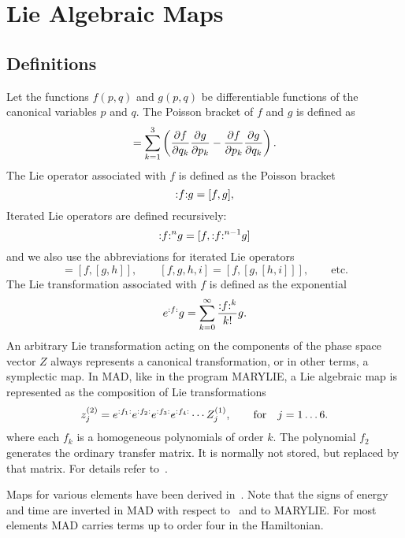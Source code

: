  
 
\chapter{Lie Algebraic Maps}
\label{LIE}
 
\section{Definitions}
Let the functions $f(p,q)$ and $g(p,q)$ be differentiable functions of
the canonical variables $p$ and $q$. The Poisson bracket of $f$ and
$g$ is defined as
\begin{equation}
[f,g] = \pbkt{f}{g}.
\end{equation}
The Lie operator associated with $f$ is defined as the Poisson bracket
\begin{equation}
{:}{f}{:} g = [f,g],
\end{equation}
Iterated Lie operators are defined recursively:
\begin{equation}
{:}{f}{:}^n g = [f,{:}{f}{:}^{n-1}g]
\end{equation}
and we also use the abbreviations for iterated Lie operators
\begin{equation}
[f,g,h] = [f,[g,h]], \qquad
[f,g,h,i] = [f,[g,[h,i]]],\qquad
\mathrm{etc.}
\end{equation}
The Lie transformation associated with $f$ is defined as the exponential
\begin{equation}
e^{{:}{f}{:}} g = \sum_{k=0}^\infty \frac{{:}{f}{:}^k}{k!} g.
\end{equation}
An arbitrary Lie transformation acting on the components of the phase
space vector $Z$ always represents a canonical transformation,
or in other terms, a symplectic map.
In MAD, like in the program MARYLIE,
a Lie algebraic map is represented as the composition of Lie
transformations
\begin{equation}
z^{(2)}_j = e^{{:}{f_1}{:}} e^{{:}{f_2}{:}} e^{{:}{f_3}{:}} e^{{:}{f_4}{:}} \cdots 
  Z^{(1)}_j, \qquad \mathrm{for} \quad j = 1 \ldots 6.
\end{equation}
where each $f_k$ is a homogeneous polynomials of order $k$.
The polynomial $f_2$ generates the ordinary transfer matrix.
It is normally not stored, but replaced by that matrix.
For details refer to~\cite{DOU82,DRA81,HEA86}.
 
Maps for various elements have been derived in~\cite{DOU82,ISE85}.
Note that the signs of energy and time are inverted in MAD with respect
to~\cite{DOU82} and to MARYLIE.
For most elements MAD carries terms up to order four in the
Hamiltonian.
 
